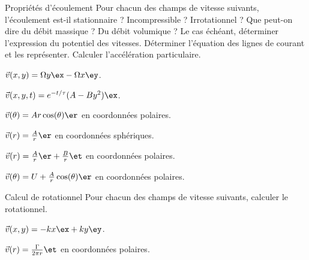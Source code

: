 \begin{exo}[PC][1][devoir]{Propriétés d’écoulement}
	Pour chacun des champs de vitesse suivants, l'écoulement est-il stationnaire ? Incompressible ? Irrotationnel ? Que peut-on dire du débit massique ? Du débit volumique ? Le cas échéant, déterminer l'expression du potentiel des vitesses. Déterminer l'équation des lignes de courant et les représenter. Calculer l’accélération particulaire.
	\begin{quest}
		\item $\Vec{v}(x,y) = \Omega y \ex - \Omega x \ey$.
		\item $\Vec{v}(x,y,t) = e^{-t/\tau}(A-By^2) \ex$.
		\item $\Vec{v}(\theta) = A r \cos(\theta) \er$ en coordonnées polaires.
		\item $\Vec{v}(r) = \frac{A}{r} \er$ en coordonnées sphériques.
		\item $\Vec{v}(r) = \frac{A}{r} \er + \frac{B}{r} \et$ en coordonnées polaires.
		\item  $\Vec{v}(\theta) = U + \frac{A}{r} \cos(\theta) \er$ en coordonnées polaires.
	\end{quest}
\end{exo}

\begin{exo}[PC][1][appli]{Calcul de rotationnel}
	Pour chacun des champs de vitesse suivants, calculer le rotationnel.
\begin{enonce}
	$\Vec{v}(x,y) = -kx \ex + ky \ey$.
\end{enonce}
\begin{enonce}
	$\Vec{v}(r) = \frac{\Gamma}{2\pi r} \et$ en coordonnées polaires.
\end{enonce}
\end{exo}

